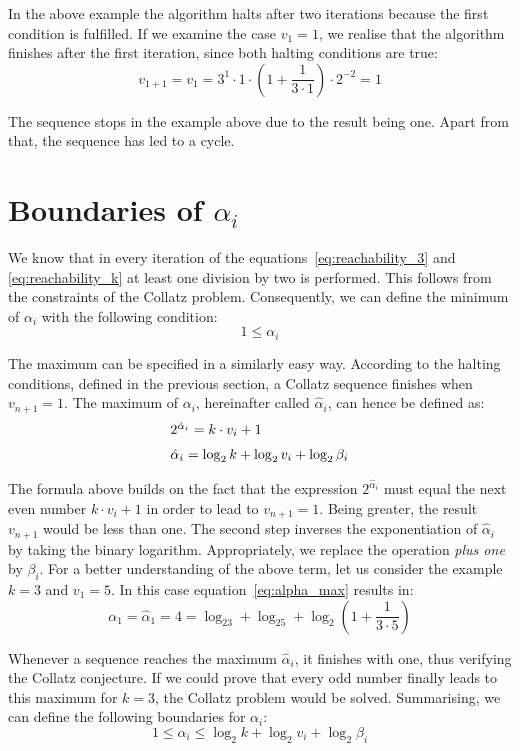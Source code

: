 \documentclass{SciPress_2015}
\begin{document}
In the above example the algorithm halts after two iterations because the first condition is fulfilled. If we examine the case $v_1=1$, we realise that the algorithm finishes after the first iteration, since both halting conditions are true:
\[
v_{1+1}=v_1=3^1\cdot 1\cdot\left(1+\frac{1}{3\cdot1}\right)\cdot2^{-2}=1
\]

The sequence stops in the example above due to the result being one. Apart from that, the sequence has led to a cycle.

\section{Boundaries of \boldmath$\alpha_i$}
We know that in every iteration of the equations~\ref{eq:reachability_3} and \ref{eq:reachability_k} at least one division by two is performed. This follows from the constraints of the Collatz problem. Consequently, we can define the minimum of $\alpha_i$ with the following condition:
\[
1\le\alpha_i
\]

The maximum can be specified in a similarly easy way. According to the halting conditions, defined in the previous section, a Collatz sequence finishes when $v_{n+1}=1$. The maximum of $\alpha_i$, hereinafter called $\hat\alpha_i$, can hence be defined as:
\begin{equation}
\label{eq:alpha_max}
\begin{array}{l}
2^{\hat\alpha_i}=k\cdot v_i+1\\[\medskipamount]
\hat\alpha_i=\log_2k+\log_2v_i+\log_2\beta_i
\end{array}
\end{equation}

The formula above builds on the fact that the expression $2^{\hat\alpha_i}$ must equal the next even number $k\cdot v_i+1$ in order to lead to $v_{n+1}=1$. Being greater, the result $v_{n+1}$ would be less than one. The second step inverses the exponentiation of $\hat\alpha_i$ by taking the binary logarithm. Appropriately, we replace the operation \textit{plus one} by $\beta_i$. For a better understanding of the above term, let us consider the example $k=3$ and $v_1=5$. In this case equation~\ref{eq:alpha_max} results in:
\[
\alpha_1=\hat\alpha_1=4=\log_23+\log_25+\log_2\left(1+\frac{1}{3\cdot5}\right)
\]

Whenever a sequence reaches the maximum $\hat\alpha_i$, it finishes with one, thus verifying the Collatz conjecture. If we could prove that every odd number finally leads to this maximum for $k=3$, the Collatz problem would be solved. Summarising, we can define the following boundaries for $\alpha_i$:
\begin{equation}
\label{eq:boundary_alpha_i}
1\le\alpha_i\le\log_2k+\log_2v_i+\log_2\beta_i
\end{equation}
\end{document}
